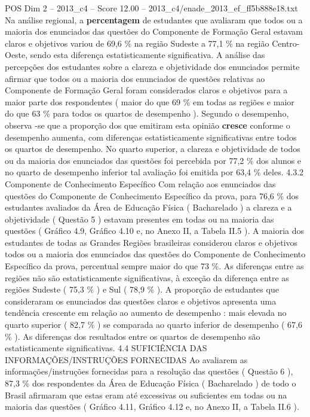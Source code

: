 \begin{textsample}{POS Dim 2 – 2013\_c4 – Score 12.00 – 2013\_c4/enade\_2013\_ef\_ff5b888e18.txt}
Na análise regional, a \textbf{percentagem} de estudantes que avaliaram que todos ou a maioria dos enunciados das questões do Componente de Formação Geral estavam claros e objetivos variou de 69,6 \% na região Sudeste a 77,1 \% na região Centro-Oeste, sendo esta diferença estatisticamente significativa.
A análise das percepções dos estudantes sobre a clareza e objetividade dos enunciados permite afirmar que todos ou a maioria dos enunciados de questões relativas ao Componente de Formação Geral foram considerados claros e objetivos para a maior parte dos respondentes ( maior do que 69 \% em todas as regiões e maior do que 63 \% para todos os quartos de desempenho ).
Segundo o desempenho, observa -se que a proporção dos que emitiram esta opinião \textbf{cresce} conforme o desempenho aumenta, com diferenças estatisticamente significativas entre todos os quartos de desempenho.
No quarto superior, a clareza e objetividade de todos ou da maioria dos enunciados das questões foi percebida por 77,2 \% dos alunos e no quarto de desempenho inferior tal avaliação foi emitida por 63,4 \% deles. 4.3.2 Componente de Conhecimento Específico Com relação aos enunciados das questões do Componente de Conhecimento Específico da prova, para 76,6 \% dos estudantes avaliados da Área de Educação Física ( Bacharelado ) a clareza e a objetividade ( Questão 5 ) estavam presentes em todas ou na maioria das questões ( Gráfico 4.9, Gráfico 4.10 e, no Anexo II, a Tabela II.5 ).
A maioria dos estudantes de todas as Grandes Regiões brasileiras considerou claros e objetivos todos ou a maioria dos enunciados das questões do Componente de Conhecimento Específico da prova, percentual sempre maior do que 73 \%.
As diferenças entre as regiões não são estatisticamente significativas, à exceção da diferença entre as regiões Sudeste ( 75,3 \% ) e Sul ( 78,9 \% ).
A proporção de estudantes que consideraram os enunciados das questões claros e objetivos apresenta uma tendência crescente em relação ao aumento de desempenho : mais elevada no quarto superior ( 82,7 \% ) se comparada ao quarto inferior de desempenho ( 67,6 \% ).
As diferenças dos resultados entre os quartos de desempenho são estatisticamente significativas. 4.4 SUFICIÊNCIA DAS INFORMAÇÕES/INSTRUÇÕES FORNECIDAS Ao avaliarem as informações/instruções fornecidas para a resolução das questões ( Questão 6 ), 87,3 \% dos respondentes da Área de Educação Física ( Bacharelado ) de todo o Brasil afirmaram que estas eram até excessivas ou suficientes em todas ou na maioria das questões ( Gráfico 4.11, Gráfico 4.12 e, no Anexo II, a Tabela II.6 ).

\end{textsample}
